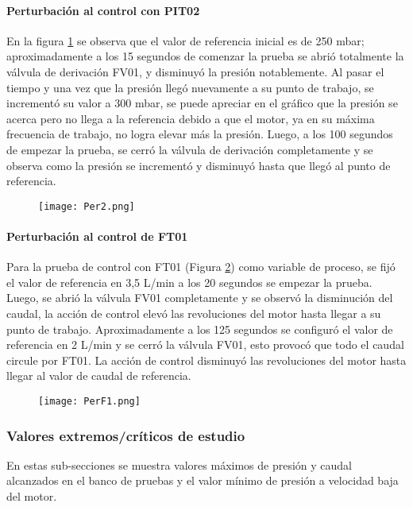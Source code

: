 {\paragraph{Perturbación al control con PIT02}
En la figura \ref{fig:per2} se observa que el valor de referencia inicial es de 250 mbar; aproximadamente a los 15 segundos de comenzar la prueba se abrió totalmente la válvula de derivación FV01, y disminuyó la presión notablemente. Al pasar el tiempo y una vez que la presión llegó nuevamente a su punto de trabajo, se incrementó su valor a 300 mbar, se puede apreciar en el gráfico que la presión se acerca pero no llega a la referencia debido a que el motor, ya en su máxima frecuencia de trabajo, no logra elevar más la presión. Luego, a los 100 segundos de empezar la prueba, se cerró la válvula de derivación completamente y se observa como la presión se incrementó y disminuyó hasta que llegó al punto de referencia.
\begin{figure}[h!]
	\centering
	\texttt{[image: Per2.png]}
	\label{fig:per2}
\end{figure}

\paragraph{Perturbación al control de FT01}
Para la prueba de control con FT01 (Figura \ref{fig:per1}) como variable de proceso, se fijó el valor de referencia en 3,5 L/min a los 20 segundos se empezar la prueba. Luego, se abrió la válvula FV01 completamente y se observó la disminución del caudal, la acción de control elevó las revoluciones del motor hasta llegar a su punto de trabajo. Aproximadamente a los 125 segundos se configuró el valor de referencia en 2 L/min y se cerró la válvula FV01, esto provocó que todo el caudal circule por FT01. La acción de control disminuyó las revoluciones del motor hasta llegar al valor de caudal de referencia.

\begin{figure}[h!]
	\centering
	\texttt{[image: PerF1.png]}
	\label{fig:per1}
\end{figure}


\subsubsection{Valores extremos/críticos de estudio}
En estas sub-secciones se muestra valores máximos de presión y caudal alcanzados en el banco de pruebas y el valor mínimo de presión a velocidad baja del motor.

}
